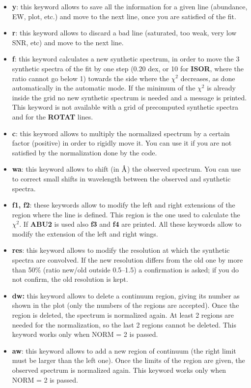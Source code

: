 \documentclass[modern]{aastex701}
\newcommand{\angstrom}{\mbox{\normalfont\AA}}
\begin{document}
\begin{itemize}
    \item {\bf y}: this keyword allows to save all the information for a given line (abundance, EW, plot, etc.) and move to the next line, once you are satisfied of the fit.
    \item {\bf r}: this keyword allows to discard a bad line (saturated, too weak, very low SNR, etc) and move to the next line.
    \item {\bf f}: this keyword calculates a new synthetic spectrum, in order to move the 3 synthetic spectra of the fit by one step (0.20 dex, or 10 for {\bf ISOR}, where the ratio cannot go below 1) towards the side where the $\chi^2$ decreases, as done automatically in the automatic mode. If the minimum of the $\chi^2$ is already inside the grid no new synthetic spectrum is needed and a message is printed. This keyword is not available with a grid of precomputed synthetic spectra and for the {\bf ROTAT} lines.
    \item {\bf c}: this keyword allows to multiply the normalized spectrum by a certain factor (positive) in order to rigidly move it. You can use it if you are not satisfied by the normalization done by the code.  
    \item {\bf wa}: this keyword allows to shift (in $\angstrom$) the observed spectrum. You can use to correct small shifts in wavelength between the observed and synthetic spectra. 
    \item {\bf f1, f2}: these keywords allow to modify the left and right extensions of the region where the line is defined. This region is the one used to calculate the $\chi^2$. If {\bf ABU2} is used also {\bf f3} and {\bf f4} are printed. All these keywords allow to modify the extension of the left and right wings.
    \item {\bf res}: this keyword allows to modify the resolution at which the synthetic spectra are convolved. If the new resolution differs from the old one by more than 50\% (ratio new/old outside 0.5--1.5) a confirmation is asked; if you do not confirm, the old resolution is kept. 
    \item {\bf dw:} this keyword allows to delete a continuum region, giving its number as shown in the plot (only the numbers of the regions are accepted). Once the region is deleted, the spectrum is normalized again. At least 2 regions are needed for the normalization, so the last 2 regions cannot be deleted. This keyword works only when NORM = 2 is passed.
    \item {\bf aw}: this keyword allows to add a new region of continuum (the right limit must be larger than the left one). Once the limits of the region are given, the observed spectrum is normalized again. This keyword works only when NORM = 2 is passed.

\end{itemize}
\end{document}
